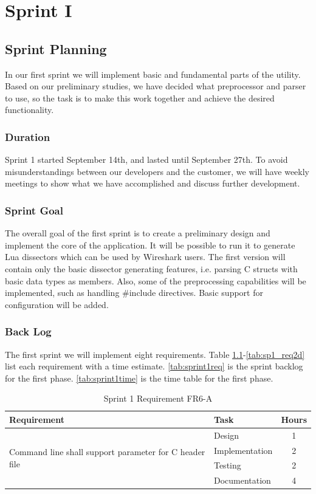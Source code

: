 \chapter{Sprint I}


\section{Sprint Planning}
In our first sprint we will implement basic and fundamental parts of the
utility. Based on our preliminary studies, we have decided what preprocessor
and parser to use, so the task is to make this work together and achieve the
desired functionality.  

\subsection{Duration}
Sprint 1 started September 14th, and lasted until September 27th. To avoid
misunderstandings between our developers and the customer, we will have weekly
meetings to show what we have accomplished and discuss further development. 

\subsection{Sprint Goal}
The overall goal of the first sprint is to create a preliminary design and
implement the core of the application. It will be possible to run it to
generate Lua dissectors which can be used by Wireshark users. The first
version will contain only the basic dissector generating features, i.e.
parsing C structs with basic data types as members. Also, some of the
preprocessing capabilities will be implemented, such as handling \#include
directives. Basic support for configuration will be added.

\subsection{Back Log}
The first sprint we will implement eight requirements. Table
\ref{tab:sp1_req7a}-\ref{tab:sp1_req2d}  list each requirement with a time
estimate. \autoref{tab:sprint1req} is the sprint backlog for the first phase.
\autoref{tab:sprint1time} is the time table for the first phase.

\begin{table}[!ht] \small \center
\caption{Sprint 1 Requirement FR6-A\label{tab:sp1_req7a}}
\begin{tabular}{l l c}
	\toprule
	Requirement & Task & Hours \\
	\midrule
	\multirow{4}{5cm}{Command line shall support parameter for C header file} & Design & 1 \\
	& Implementation & 2 \\
	& Testing & 2 \\
	& Documentation & 4 \\
	\bottomrule
\end{tabular}
\end{table}

